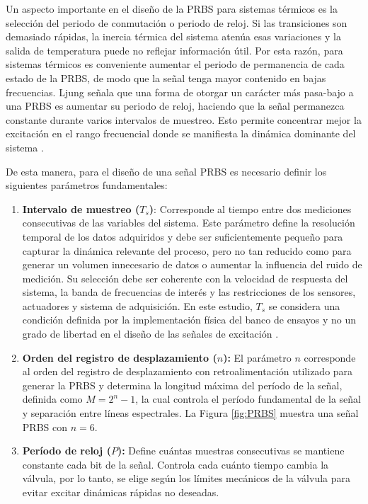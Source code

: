 \documentclass[11pt]{report}
\begin{document}
Un aspecto importante en el diseño de la PRBS para sistemas térmicos es la selección del periodo de conmutación o periodo de reloj. Si las transiciones son demasiado rápidas, la inercia térmica del sistema atenúa esas variaciones y la salida de temperatura puede no reflejar información útil. Por esta razón, para sistemas térmicos es conveniente aumentar el periodo de permanencia de cada estado de la PRBS, de modo que la señal tenga mayor contenido en bajas frecuencias. Ljung señala que una forma de otorgar un carácter más pasa-bajo a una PRBS es aumentar su periodo de reloj, haciendo que la señal permanezca constante durante varios intervalos de muestreo. Esto permite concentrar mejor la excitación en el rango frecuencial donde se manifiesta la dinámica dominante del sistema \cite{ljung1999system}.

De esta manera, para el diseño de una señal PRBS es necesario definir los siguientes parámetros fundamentales:
\begin{enumerate}
\item \textbf{Intervalo de muestreo ($T_s$)}: Corresponde al tiempo entre dos mediciones consecutivas de las variables del sistema. Este parámetro define la resolución temporal de los datos adquiridos y debe ser suficientemente pequeño para capturar la dinámica relevante del proceso, pero no tan reducido como para generar un volumen innecesario de datos o aumentar la influencia del ruido de medición. Su selección debe ser coherente con la velocidad de respuesta del sistema, la banda de frecuencias de interés y las restricciones de los sensores, actuadores y sistema de adquisición. En este estudio, $T_s$ se considera una condición definida por la implementación física del banco de ensayos y no un grado de libertad en el diseño de las señales de excitación \cite{ljung1999system}. 

\item \textbf{Orden del registro de desplazamiento ($n$):} El parámetro $n$ corresponde al orden del registro de desplazamiento con retroalimentación utilizado para generar la PRBS y determina la longitud máxima del período de la señal, definida como $M=2^{n}-1$, la cual controla el período fundamental de la señal y separación entre líneas espectrales. La Figura \ref{fig:PRBS} muestra una señal PRBS con $n=6$.

  \item \textbf{Período de reloj ($P$):} Define cuántas muestras consecutivas se mantiene constante cada bit de la señal. Controla cada cuánto tiempo cambia la válvula, por lo tanto, se elige según los límites mecánicos de la válvula para evitar excitar dinámicas rápidas no deseadas.
\end{enumerate}
\end{document}

